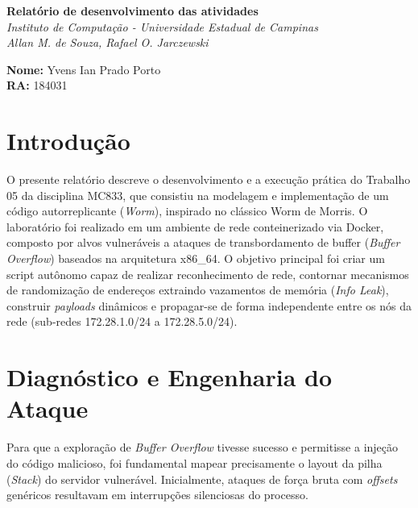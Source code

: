 \documentclass{article}
\begin{document}
\thispagestyle{empty} %
\noindent
{
\selectfont %
\fontsize{11pt}{13.2pt}\selectfont %
\begin{minipage}[c]{0.15\textwidth}
    \centering
    \LogoUnicamp %
\end{minipage}
\hfill
\begin{minipage}[c]{0.65\textwidth}
    \centering
    \textbf{Relatório de desenvolvimento das atividades}\\[0.2cm]
    \textit{Instituto de Computação - Universidade Estadual de Campinas\\Allan M. de Souza, Rafael O. Jarczewski}
\end{minipage}
\hfill
\begin{minipage}[c]{0.15\textwidth}
    \centering
    \LogoIcUnicamp %
\end{minipage}

\vspace{1cm}
}

\noindent\textbf{Nome:} Yvens Ian Prado Porto\\
\textbf{RA:} 184031

\section{Introdução}
O presente relatório descreve o desenvolvimento e a execução prática do Trabalho 05 da disciplina MC833, que consistiu na modelagem e implementação de um código autorreplicante (\textit{Worm}), inspirado no clássico Worm de Morris. O laboratório foi realizado em um ambiente de rede conteinerizado via Docker, composto por alvos vulneráveis a ataques de transbordamento de buffer (\textit{Buffer Overflow}) baseados na arquitetura x86\_64. O objetivo principal foi criar um script autônomo capaz de realizar reconhecimento de rede, contornar mecanismos de randomização de endereços extraindo vazamentos de memória (\textit{Info Leak}), construir \textit{payloads} dinâmicos e propagar-se de forma independente entre os nós da rede (sub-redes 172.28.1.0/24 a 172.28.5.0/24).

\section{Diagnóstico e Engenharia do Ataque}
Para que a exploração de \textit{Buffer Overflow} tivesse sucesso e permitisse a injeção do código malicioso, foi fundamental mapear precisamente o layout da pilha (\textit{Stack}) do servidor vulnerável. Inicialmente, ataques de força bruta com \textit{offsets} genéricos resultavam em interrupções silenciosas do processo.
\end{document}

